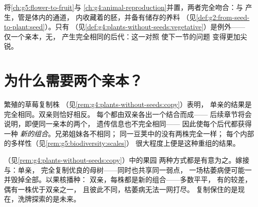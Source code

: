 \begin{remark}[植物遵循同一核心]\label{rem:g8:sexual-reproduction:plants}
将\cref{ch:g5:flower-to-fruit}与
\cref{ch:g4:animal-reproduction}并置，两者完全吻合：与
产生，管是体内的通道，
内收藏着的胚，并备有储存的养料
（见\cref{def:g2:from-seed-to-plant:seed}）。只有
（见\cref{def:g4:plants-without-seeds:vegetative}）是例外——
仅一个亲本，无，
产生完全相同的后代：这一对照
使下一节的问题
变得更加尖锐。
\end{remark}

\section{为什么需要两个亲本？}

\begin{proposition}[有性生殖促成重组]\label{prop:g8:sexual-reproduction:shuffle}
繁殖的草莓复制株
（见\cref{rem:g4:plants-without-seeds:copy}）表明，
单亲的结果是完全相同。双亲则恰好相反。
每个都由双亲各出一个结合而成——
后续章节将会说明，即便同一亲本的两个，
遗传信息也不完全相同——
因此使每个后代都获得一种
\emph{新的组合}。兄弟姐妹各不相同；
同一豆荚中的没有两株完全一样；
每个内部的多样性（见\cref{rem:g5:biodiversity:scales}）
很大程度上便是这种重组的结果。
\end{proposition}
\admitted

\begin{example}[果园的两种赌注]\label{ex:g8:sexual-reproduction:bets}
（见\cref{rem:g4:plants-without-seeds:copy}）中的果园
两种方式都是有意为之。嫁接与：单亲，
完全复制优良的母树——同时也共享同一弱点，
一场枯萎病便可能一并毁掉全部。以果核播种：
双亲，每株都是新的组合——多数平平，
有的较差，偶有一株优于双亲之一，
且彼此不同，枯萎病无法一网打尽。
复制保住的是现在，洗牌探索的是未来。
\end{example}

